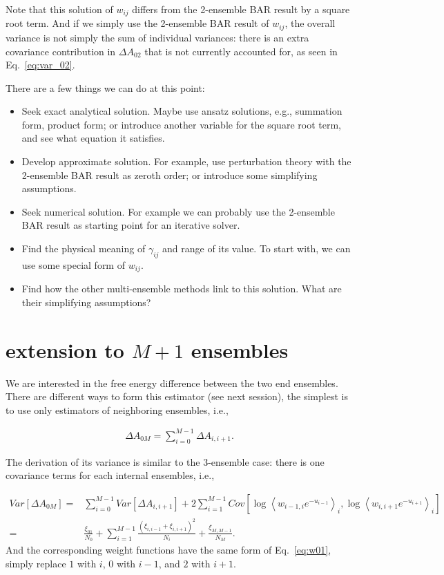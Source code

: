 \documentclass[notitlepage, amsmath, amssymb, aps]{revtex4-1}
\begin{document}
Note that this solution of $w_{ij}$ differs from the 2-ensemble BAR result by a square root term.
And if we simply use the 2-ensemble BAR result of $w_{ij}$,
the overall variance is not simply the sum of individual variances:
there is an extra covariance contribution in $\Delta A_{02}$ that is not currently accounted for, as seen in Eq.~\ref{eq:var_02}.

There are a few things we can do at this point:

\begin{itemize}
    \item Seek exact analytical solution. Maybe use ansatz solutions, e.g., summation form, product form; or introduce another variable for the square root term, and see what equation it satisfies.
    \item Develop approximate solution. For example, use perturbation theory with the 2-ensemble BAR result as zeroth order; or introduce some simplifying assumptions.
    \item Seek numerical solution. For example we can probably use the 2-ensemble BAR result as starting point for an iterative solver.
    \item Find the physical meaning of $\gamma_{ij}$ and range of its value. To start with, we can use some special form of $w_{ij}$.
    \item Find how the other multi-ensemble methods link to this solution. What are their simplifying assumptions?
\end{itemize}

\section{extension to $M+1$ ensembles}

We are interested in the free energy difference between the two end ensembles.
There are different ways to form this estimator (see next session),
the simplest is to use only estimators of neighboring ensembles, i.e.,

\begin{align}
    \Delta A_{0M} = \sum_{i=0}^{M-1}\Delta A_{i,i+1}. \label{eq:A_0N}
\end{align}

The derivation of its variance is similar to the 3-ensemble case:
there is one covariance terms for each internal ensembles, i.e.,

\begin{align}
    Var[\Delta A_{0M}] =& \sum_{i=0}^{M-1}Var[\Delta A_{i,i+1}]
    + 2\sum_{i=1}^{M-1}Cov[\log\left<w_{i-1,i}e^{-u_{i-1}}\right>_i, \log\left<w_{i, i+1}e^{-u_{i+1}}\right>_i]\\
    =& \frac{\xi_{01}}{N_0}
      + \sum_{i=1}^{M-1}\frac{(\xi_{i,i-1} + \xi_{i,i+1})^ 2}{N_i}
      + \frac{\xi_{M, M-1}}{N_{M}}.
\end{align}
And the corresponding weight functions have the same form of Eq.~\ref{eq:w01},
simply replace $1$ with $i$, $0$ with $i-1$, and $2$ with $i+1$.
\end{document}
